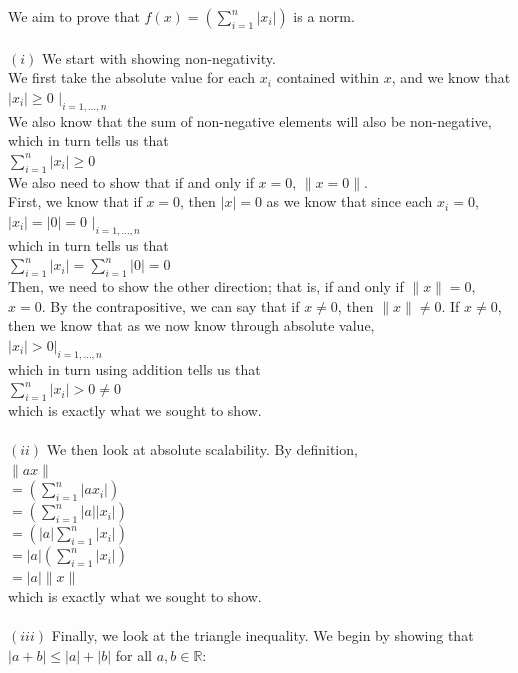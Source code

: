 \documentclass{article}
\newcommand{\field}[1]{\mathbb{#1}}
\newcommand{\1}{\mathbf{1}}
\newcommand{\R}{\field{R}} %
\begin{document}
{We aim to prove that $f(x) = \left( \sum_{i=1}^n |x_i| \right)$ is a norm. \\ \\
$(i)$ We start with showing non-negativity. \\
We first take the absolute value for each $x_i$ contained within $x$, and we know that \\
$|x_i| \geq 0$ $|_{i = 1, \dots, n}$ \\
We also know that the sum of non-negative elements will also be non-negative, which in turn tells us that \\ 
$\sum_{i=1}^{n} |x_i| \geq 0$ \\
We also need to show that if and only if $x = 0$, $\|x = 0\|$. \\
First, we know that if $x = 0$, then $|x| = 0$ as we know that since each $x_i = 0$,  \\
$|x_i| = |0| = 0$ $|_{i = 1, \dots, n}$ \\
which in turn tells us that \\ 
$\sum_{i=1}^{n} |x_i| = \sum_{i=1}^{n} |0| = 0$ \\
Then, we need to show the other direction; that is, if and only if $\|x\| = 0$, $x = 0$. By the contrapositive, we can say that if $x \neq 0$, then $\|x\| \neq 0$. If $x \neq 0$, then we know that as we now know through absolute value, \\
$|x_i| > 0 |_{i = 1, \dots, n}$ \\
which in turn using addition tells us that  \\ 
$\sum_{i=1}^{n} |x_i| > 0 \neq 0$ \\
which is exactly what we sought to show. \\ \\
$(ii)$ We then look at absolute scalability. By definition, \\
$\|ax\| $ \\
$ = (\sum_{i=1}^{n} |ax_i|)$ \\
$ = (\sum_{i=1}^{n} |a| |x_i|)$ \\
$ = (|a| \sum_{i=1}^{n} |x_i|)$ \\
$ = |a| (\sum_{i=1}^{n} |x_i|)$ \\
$ = |a| \|x\|$ \\
which is exactly what we sought to show. \\ \\
$(iii)$ Finally, we look at the triangle inequality. We begin by showing that $|a + b| \leq |a| + |b|$ for all $a, b \in \R$: \\
}
\end{document}
